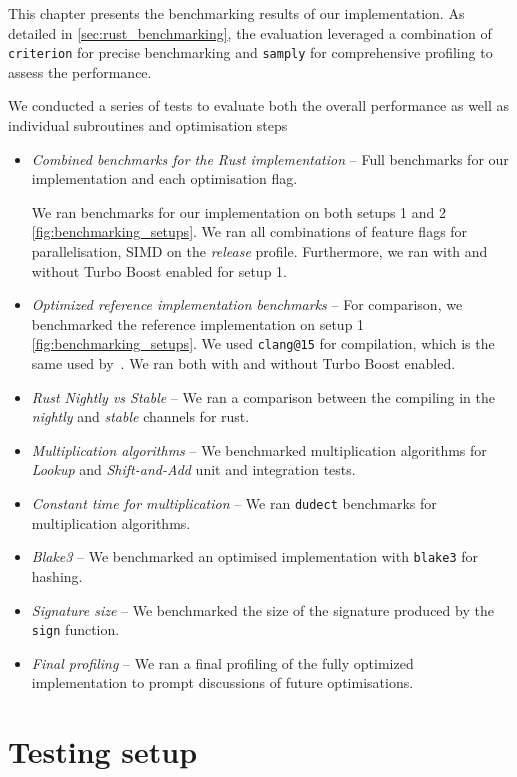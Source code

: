 \documentclass[11pt]{report}
\theoremstyle{definition}
\theoremstyle{plain}
\begin{document}
This chapter presents the benchmarking results of our implementation. As detailed in \autoref{sec:rust_benchmarking}, the evaluation leveraged a combination of \texttt{criterion} for precise benchmarking and \texttt{samply} for comprehensive profiling to assess the performance.

We conducted a series of tests to evaluate both the overall performance as well as individual subroutines and optimisation steps

\begin{itemize}[parsep=0pt, itemsep=3pt]
  \item \textit{Combined benchmarks for the Rust implementation} -- Full benchmarks for our implementation and each optimisation flag.

        We ran benchmarks for our implementation on both setups 1 and 2 \autoref{fig:benchmarking_setups}. We ran all combinations of feature flags for parallelisation, SIMD on the \textit{release} profile. Furthermore, we ran with and without Turbo Boost enabled for setup 1.
  \item \textit{Optimized reference implementation benchmarks} -- For comparison, we benchmarked the reference implementation on setup 1 \autoref{fig:benchmarking_setups}. We used \texttt{clang@15} for compilation, which is the same used by~\cite{aguilarsyndrome11}. We ran both with and without Turbo Boost enabled.
  \item \textit{Rust Nightly vs Stable} -- We ran a comparison between the compiling in the \textit{nightly} and \textit{stable} channels for rust.
  \item \textit{Multiplication algorithms} -- We benchmarked multiplication algorithms for \textit{Lookup} and \textit{Shift-and-Add} unit and integration tests.
  \item \textit{Constant time for multiplication} -- We ran \texttt{dudect} benchmarks for multiplication algorithms.
  \item \textit{Blake3} -- We benchmarked an optimised implementation with \texttt{blake3} for hashing.
  \item \textit{Signature size} -- We benchmarked the size of the signature produced by the \texttt{sign} function.
  \item \textit{Final profiling} -- We ran a final profiling of the fully optimized implementation to prompt discussions of future optimisations.
\end{itemize}

\section{Testing setup}\label{sub:testing_setup}
\end{document}
